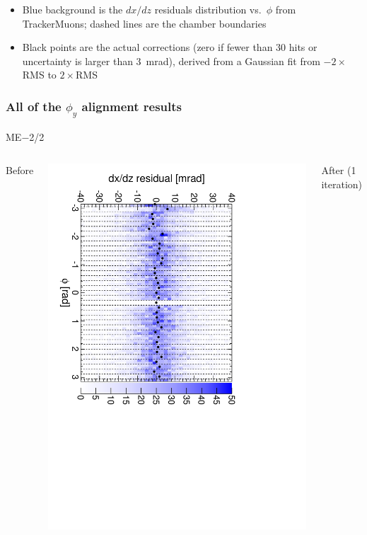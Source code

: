 \documentclass[compress]{beamer}
\begin{document}
\begin{frame}
\begin{itemize}
\item Blue background is the $dx/dz$ residuals distribution
  vs.\ $\phi$ from TrackerMuons; dashed lines are the chamber boundaries
\item Black points are the actual corrections (zero if fewer than 30
  hits or uncertainty is larger than 3~mrad), derived from a Gaussian
  fit from $-2\times$RMS to $2\times$RMS
\end{itemize}
\end{frame}

\begin{frame}
\frametitle{All of the $\phi_y$ alignment results}
\begin{center}
ME$-$2/2
\end{center}

\begin{columns}
\centering Before

\includegraphics[height=\linewidth, angle=90]{iter01_mem22.pdf}

\centering After (1 iteration)


\end{columns}
\end{frame}
\end{document}
